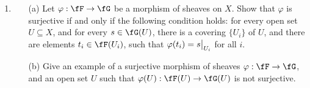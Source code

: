 \documentclass[a4paper]{article}
\begin{document}
\begin{enumerate} [label=\textbf{\arabic*.}, leftmargin=0em]
          \begin{proof} $ $ \vspace{0pt}
              \begin{itemize} [leftmargin=0cm]
                  \item[(a)] It is true in general that kernels commute with limits and cokernels commmute with colimits in any abelian category, since kernels and cokernels can be realized as limits and colimits, respectively.

                  \item[(b)] $\varphi$ is injective $\Leftrightarrow$ $\ker{\varphi} = 0$ $\Leftrightarrow$ $(\ker{\varphi})_P = 0$ $\Leftrightarrow$ $\ker{\varphi_P} = 0$.

                        $\varphi$ is surjective $\Leftrightarrow$ $\im{\varphi} = \fG$ $\Leftrightarrow$ $\im(\varphi_P) = (\im{\varphi})_P = \fG_P$.

                  \item[(c)] The sequence $\dots \to \fF^{i - 1} \xrightarrow{\varphi^{i - 1}} \fF^i \xrightarrow{\varphi^i} \fF^{i + 1} \to \dots$ is exact $\Leftrightarrow$ $\im{\varphi^{i - 1}} = \ker{\varphi^i}$ for all $i$ $\Leftrightarrow$ $(\im{\varphi^{i - 1}})_P = (\ker{\varphi^i})_P$ for all $i$ and $P \in X$ $\Leftrightarrow$ $\im(\varphi^{i - 1}_P) = \ker(\varphi^i_P)$ for all $i$ and $P \in X$ by part (a) above.
              \end{itemize}
          \end{proof}

    \item \begin{itemize}
              \item[(a)] Let $\varphi : \fF \to \fG$ be a morphism of sheaves on $X$. Show that $\varphi$ is surjective if and only if the following condition holds: for every open set $U \subseteq X$, and for every $s \in \fG(U)$, there is a covering $\{ U_i \}$ of $U$, and there are elements $t_i \in \fF(U_i)$, such that $\varphi(t_i) = \restr{s}{U_i}$ for all $i$.
              \item[(b)] Give an example of a surjective morphism of sheaves $\varphi : \fF \to \fG$, and an open set $U$ such that $\varphi(U) : \fF(U) \to \fG(U)$ is not surjective.
          \end{itemize}


\end{enumerate}
\end{document}
